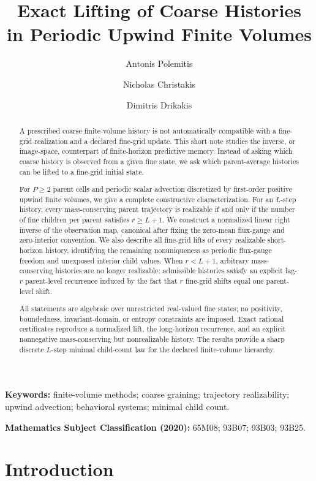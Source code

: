 \documentclass[11pt]{article}
\title{Exact Lifting of Coarse Histories\\
in Periodic Upwind Finite Volumes}
\author[1]{Antonis Polemitis}
\author[2,*]{Nicholas Christakis}
\author[2]{Dimitris Drikakis}
\affil[1]{UNIC Evolve, University of Nicosia, Nicosia CY-2417, Cyprus}
\affil[2]{Institute for Advanced Modelling and Simulation,
University of Nicosia, Nicosia CY-2417, Cyprus}
\affil[*]{Corresponding author: \texttt{christakis.n@unic.ac.cy}}
\begin{document}
\maketitle

\begin{abstract}
A prescribed coarse finite-volume history is not automatically compatible
with a fine-grid realization and a declared fine-grid update.  This short
note studies the inverse, or image-space, counterpart of finite-horizon
predictive memory.  Instead of asking which coarse history is observed from a
given fine state, we ask which parent-average histories can be lifted to a
fine-grid initial state.

For \(P\ge2\) parent cells and periodic scalar advection discretized by
first-order positive upwind finite volumes, we give a complete constructive
characterization.  For an \(L\)-step history, every mass-conserving parent
trajectory is realizable if and only if the number of fine children per
parent satisfies \(r\ge L+1\).  We construct a normalized linear right
inverse of the observation map, canonical after fixing the zero-mean
flux-gauge and zero-interior convention.  We also describe all fine-grid
lifts of every realizable short-horizon history, identifying the remaining
nonuniqueness as periodic flux-gauge freedom and unexposed interior child
values.  When \(r<L+1\), arbitrary mass-conserving histories are no longer
realizable: admissible histories satisfy an explicit lag-\(r\) parent-level
recurrence induced by the fact that \(r\) fine-grid shifts equal one
parent-level shift.

All statements are algebraic over unrestricted real-valued fine states; no
positivity, boundedness, invariant-domain, or entropy constraints are
imposed.  Exact rational certificates reproduce a normalized lift, the
long-horizon recurrence, and an explicit nonnegative mass-conserving but
nonrealizable history.  The results provide a sharp discrete \(L\)-step
minimal child-count law for the declared finite-volume hierarchy.
\end{abstract}

\noindent\textbf{Keywords:}
finite-volume methods; coarse graining; trajectory realizability; upwind
advection; behavioral systems; minimal child count.

\medskip

\noindent\textbf{Mathematics Subject Classification (2020):}
65M08; 93B07; 93B03; 93B25.

\section{Introduction}
\label{sec:introduction}
\end{document}
